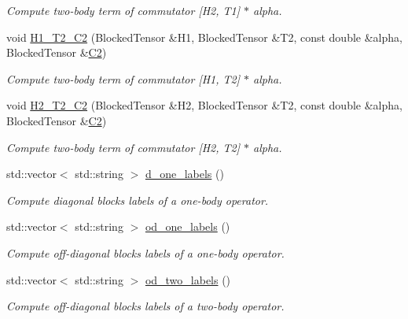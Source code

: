 \begin{DoxyCompactItemize}
\begin{DoxyCompactList}\small\item\em Compute two-\/body term of commutator \mbox{[}H2, T1\mbox{]} $\ast$ alpha. \end{DoxyCompactList}\item 
void \mbox{\hyperlink{classforte_1_1_d_s_r_g___m_r_p_t_a0d6154e51d2a19c2e21e11b0e96e8867}{H1\+\_\+\+T2\+\_\+\+C2}} (Blocked\+Tensor \&H1, Blocked\+Tensor \&T2, const double \&alpha, Blocked\+Tensor \&\mbox{\hyperlink{namespaceforte_abe00ec86d0015c0f2b6ac298c6e428e4af1a543f5a2c5d49bc5dde298fcf716e4}{C2}})
\begin{DoxyCompactList}\small\item\em Compute two-\/body term of commutator \mbox{[}H1, T2\mbox{]} $\ast$ alpha. \end{DoxyCompactList}\item 
void \mbox{\hyperlink{classforte_1_1_d_s_r_g___m_r_p_t_a9cd4ca67158a2be41a836acc82236640}{H2\+\_\+\+T2\+\_\+\+C2}} (Blocked\+Tensor \&H2, Blocked\+Tensor \&T2, const double \&alpha, Blocked\+Tensor \&\mbox{\hyperlink{namespaceforte_abe00ec86d0015c0f2b6ac298c6e428e4af1a543f5a2c5d49bc5dde298fcf716e4}{C2}})
\begin{DoxyCompactList}\small\item\em Compute two-\/body term of commutator \mbox{[}H2, T2\mbox{]} $\ast$ alpha. \end{DoxyCompactList}\item 
std\+::vector$<$ std\+::string $>$ \mbox{\hyperlink{classforte_1_1_d_s_r_g___m_r_p_t_a964c93822e3b9da6cd1539904ccd5fda}{d\+\_\+one\+\_\+labels}} ()
\begin{DoxyCompactList}\small\item\em Compute diagonal blocks labels of a one-\/body operator. \end{DoxyCompactList}\item 
std\+::vector$<$ std\+::string $>$ \mbox{\hyperlink{classforte_1_1_d_s_r_g___m_r_p_t_a66d95151f42dfb54a89ce06448f845e9}{od\+\_\+one\+\_\+labels}} ()
\begin{DoxyCompactList}\small\item\em Compute off-\/diagonal blocks labels of a one-\/body operator. \end{DoxyCompactList}\item 
std\+::vector$<$ std\+::string $>$ \mbox{\hyperlink{classforte_1_1_d_s_r_g___m_r_p_t_aa557563ab780d878347fbb39001e44fe}{od\+\_\+two\+\_\+labels}} ()
\begin{DoxyCompactList}\small\item\em Compute off-\/diagonal blocks labels of a two-\/body operator. \end{DoxyCompactList}\item 

\end{DoxyCompactItemize}
